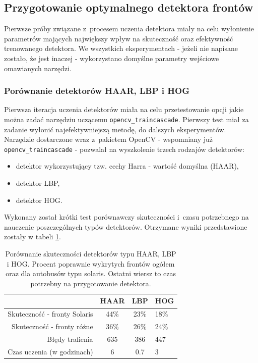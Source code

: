 \subsection{Przygotowanie optymalnego detektora frontów}

Pierwsze próby związane z~procesem uczenia detektora miały na celu 
wyłonienie parametrów mających największy wpływ na skuteczność 
oraz efektywność trenowanego detektora.
We wszystkich eksperymentach - jeżeli nie napisane zostało, że
jest inaczej - wykorzystano domyślne parametry wejściowe omawianych 
narzędzi.

\subsubsection{Porównanie detektorów HAAR, LBP i HOG}

Pierwsza iteracja uczenia detektorów miała na celu przetestowanie
opcji jakie można zadać narzędziu uczącemu \verb|opencv_traincascade|.
Pierwszy test miał za zadanie wyłonić najefektywniejszą metodę, do dalszych
eksperymentów. Narzędzie dostarczone wraz z~pakietem OpenCV - wspomniany
już \verb|opencv_traincascade| - pozwalał na wyszkolenie trzech
rodzajów detektorów:

\begin{itemize}
    \item detektor wykorzystujący tzw. cechy Harra - wartość 
        domyślna (HAAR),
    \item detektor LBP,
    \item detektor HOG.
\end{itemize}

Wykonany został
krótki test porównawczy skuteczności i~czasu potrzebnego na nauczenie
poszczególnych typów detektorów. Otrzymane wyniki przedstawione 
zostały w tabeli \ref{tab:haar_lbp_hog_comparison}.

\begin{table}[!h]
\centering
\begin{tabular}{r|c|c|l}
             & HAAR     & LBP  & HOG  \\
    \hline
Skuteczność - fronty Solaris      & 44\%     & 23\% & 18\%  \\
Skuteczność - fronty różne        & 36\%     & 26\% & 24\%  \\
Błędy trafienia            & 635      & 386  & 447   \\
Czas uczenia (w godzinach) & 6 & 0.7 & 3  
\end{tabular}
\caption{Porównanie skuteczności detektorów typu HAAR, LBP i HOG.
Procent poprawnie wykrytych frontów ogółem oraz dla autobusów typu 
solaris. Ostatni wiersz to czas potrzebny na przygotowanie detektora.}
\label{tab:haar_lbp_hog_comparison}
\end{table}

